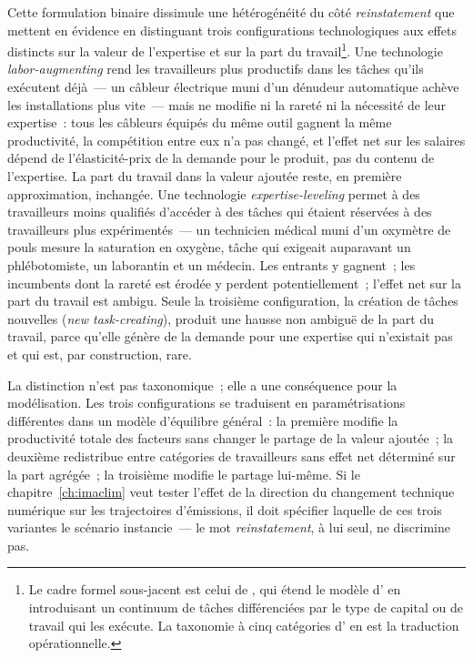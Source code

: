 Cette formulation binaire dissimule une hétérogénéité du côté \emph{reinstatement} que \textcite{acemoglu_building_2026} mettent en évidence en distinguant trois configurations technologiques aux effets distincts sur la valeur de l'expertise et sur la part du travail\footnote{Le cadre formel sous-jacent est celui de \textcite{acemoglu_tasks_2025}, qui étend le modèle d'\textcite{acemoglu_race_2018} en introduisant un continuum de tâches différenciées par le type de capital ou de travail qui les exécute. La taxonomie à cinq catégories d'\textcite{acemoglu_building_2026} en est la traduction opérationnelle.}. Une technologie \emph{labor-augmenting} rend les travailleurs plus productifs dans les tâches qu'ils exécutent déjà~--- un câbleur électrique muni d'un dénudeur automatique achève les installations plus vite~--- mais ne modifie ni la rareté ni la nécessité de leur expertise~: tous les câbleurs équipés du même outil gagnent la même productivité, la compétition entre eux n'a pas changé, et l'effet net sur les salaires dépend de l'élasticité-prix de la demande pour le produit, pas du contenu de l'expertise. La part du travail dans la valeur ajoutée reste, en première approximation, inchangée. Une technologie \emph{expertise-leveling} permet à des travailleurs moins qualifiés d'accéder à des tâches qui étaient réservées à des travailleurs plus expérimentés~--- un technicien médical muni d'un oxymètre de pouls mesure la saturation en oxygène, tâche qui exigeait auparavant un phlébotomiste, un laborantin et un médecin. Les entrants y gagnent~; les incumbents dont la rareté est érodée y perdent potentiellement~; l'effet net sur la part du travail est ambigu. Seule la troisième configuration, la création de tâches nouvelles (\emph{new task-creating}), produit une hausse non ambiguë de la part du travail, parce qu'elle génère de la demande pour une expertise qui n'existait pas et qui est, par construction, rare.

La distinction n'est pas taxonomique~; elle a une conséquence pour la modélisation. Les trois configurations se traduisent en paramétrisations différentes dans un modèle d'équilibre général~: la première modifie la productivité totale des facteurs sans changer le partage de la valeur ajoutée~; la deuxième redistribue entre catégories de travailleurs sans effet net déterminé sur la part agrégée~; la troisième modifie le partage lui-même. Si le chapitre~\ref{ch:imaclim} veut tester l'effet de la direction du changement technique numérique sur les trajectoires d'émissions, il doit spécifier laquelle de ces trois variantes le scénario instancie~--- le mot \emph{reinstatement}, à lui seul, ne discrimine pas.


